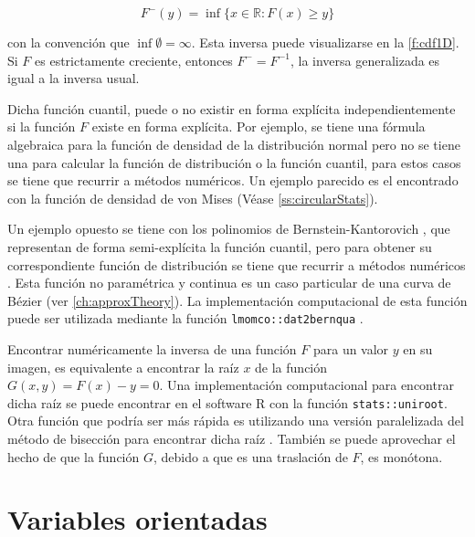 \begin{equation}
	F^-(y)= \inf \{x \in \mathbb{R}:F(x) \ge y\}
	\label{e:generalizedInv}
\end{equation}

\noindent
con la convenci\'on que $\inf \emptyset = \infty$. Esta inversa puede visualizarse en la \autoref{f:cdf1D}. Si $F$ es estrictamente creciente, entonces $F^- = F^{-1}$, la inversa generalizada es igual a la inversa usual.

Dicha funci\'on cuantil, puede o no existir en forma expl\'icita independientemente si la funci\'on $F$ existe en forma expl\'icita. Por ejemplo, se tiene una f\'ormula algebraica para la funci\'on de densidad de la distribuci\'on normal pero no se tiene una para calcular la funci\'on de distribuci\'on o la funci\'on cuantil, para estos casos se tiene que recurrir a m\'etodos num\'ericos. Un ejemplo parecido es el encontrado con la funci\'on de densidad de von Mises (V\'ease \autoref{ss:circularStats}).

Un ejemplo opuesto se tiene con los polinomios de Bernstein-Kantorovich \citep{munoz-perez_estimating_1987}, que representan de forma semi-expl\'icita la funci\'on cuantil, pero para obtener su correspondiente funci\'on de distribuci\'on se tiene que recurrir a m\'etodos num\'ericos \citep{quarteroni_numerical_2006,dahlquist_numerical_2008}. Esta funci\'on no param\'etrica y continua es un caso particular de una curva de B\'ezier (ver \autoref{ch:approxTheory}). La implementaci\'on computacional de esta funci\'on puede ser utilizada mediante la funci\'on \verb|lmomco::dat2bernqua| \citep{asquith_lmomco:_2017}.

Encontrar num\'ericamente la inversa de una funci\'on $F$ para un valor $y$ en su imagen, es equivalente a encontrar la ra\'iz $x$ de la funci\'on $G(x,y)= F(x) - y = 0$. Una implementaci\'on computacional para encontrar dicha ra\'iz se puede encontrar en el software R con la funci\'on \verb|stats::uniroot|. Otra funci\'on que podr\'ia ser m\'as r\'apida es utilizando una versi\'on paralelizada del m\'etodo de bisecci\'on para encontrar dicha ra\'iz \citep{miranker_survey_1971,nijmeijer_parallel_2015,stack_overflow_algorithm_2017,karniadakis_parallel_2003}. Tambi\'en se puede aprovechar el hecho de que la funci\'on $G$, debido a que es una traslaci\'on de $F$, es mon\'otona.


% 

\section{Variables orientadas}
\label{ss:circularStats}

